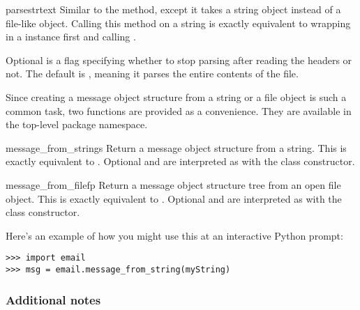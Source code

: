 \begin{methoddesc}[Parser]{parsestr}{text}
Similar to the  method, except it takes a string
object instead of a file-like object.  Calling this method on a string
is exactly equivalent to wrapping  in a 
instance first and calling .

Optional  is a flag specifying whether to stop
parsing after reading the headers or not.  The default is ,
meaning it parses the entire contents of the file.

\end{methoddesc}

Since creating a message object structure from a string or a file
object is such a common task, two functions are provided as a
convenience.  They are available in the top-level 
package namespace.

\begin{funcdesc}{message_from_string}{s}
Return a message object structure from a string.  This is exactly
equivalent to .  Optional  and
 are interpreted as with the  class constructor.

\end{funcdesc}

\begin{funcdesc}{message_from_file}{fp}
Return a message object structure tree from an open file object.  This
is exactly equivalent to .  Optional
 and  are interpreted as with the
 class constructor.

\end{funcdesc}

Here's an example of how you might use this at an interactive Python
prompt:

\begin{verbatim}
>>> import email
>>> msg = email.message_from_string(myString)
\end{verbatim}

\subsubsection{Additional notes}

